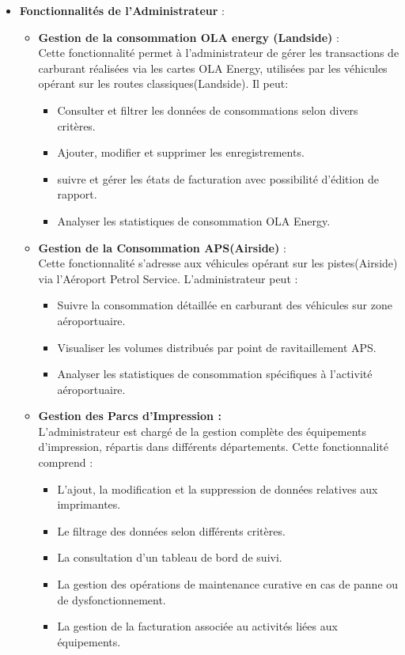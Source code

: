 \documentclass[a4paper,11pt]{report}
\begin{document}
\begin{itemize}
	\item \textbf{Fonctionnalités de l'Administrateur}  :
	\begin{itemize}
		\item \textbf{Gestion de la consommation OLA energy (Landside)} :\\
		Cette fonctionnalité permet à l'administrateur de gérer les transactions de carburant réalisées via les cartes OLA Energy, utilisées par les véhicules opérant sur les routes classiques(Landside). Il peut:
		\begin{itemize}
			\item Consulter et filtrer les données de consommations selon divers critères.
			\item Ajouter, modifier et supprimer les enregistrements.
			\item suivre et gérer les états de facturation avec possibilité d'édition de rapport.
			\item Analyser les statistiques de consommation OLA Energy.\\
		\end{itemize}
	
		\item \textbf{Gestion de la Consommation APS(Airside)} : \\
Cette fonctionnalité s'adresse aux véhicules opérant sur les pistes(Airside) via l'Aéroport Petrol Service. L'administrateur peut :
	\begin{itemize}
		\item Suivre la consommation détaillée en carburant des véhicules sur zone aéroportuaire.
		\item Visualiser les volumes distribués par point de ravitaillement APS.
		\item Analyser les statistiques de consommation spécifiques à l'activité aéroportuaire.\\
	\end{itemize}
	
	\item \textbf{Gestion des Parcs d'Impression :} \\
	L'administrateur est chargé de la gestion complète des équipements d'impression, répartis dans différents départements. Cette fonctionnalité comprend : 
	\begin{itemize}
		\item L'ajout, la modification et la suppression de données relatives aux imprimantes.
		\item Le filtrage des données selon différents critères.
		\item La consultation d'un tableau de bord de suivi.
		\item La gestion des opérations de maintenance curative en cas de panne ou de dysfonctionnement.
		\item La gestion de la facturation associée au activités liées aux équipements.\\ 
	\end{itemize}	 
	

\end{itemize}
\end{itemize}
\end{document}
